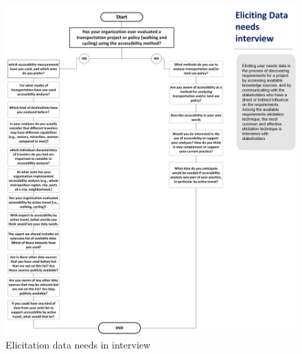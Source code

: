 \documentclass[
11pt, %
oneside, %
english, %
singlespacing, %
]{macthesis} %
\begin{document}
\begin{figure}

{\centering \includegraphics[width=0.9\linewidth]{figure/ch02-Fig-04} 

}

\caption{Elicitation data needs in interview}\label{fig:Flowchart}
\end{figure}
\end{document}
